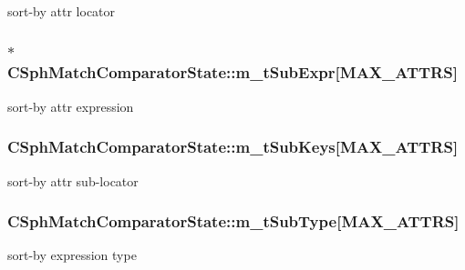 sort-\/by attr locator 

\hypertarget{structCSphMatchComparatorState_a0a3dca4e697aafc3619015e613e2259a}{
\subsubsection[{m\-\_\-t\-Sub\-Expr}]{$\ast$ C\-Sph\-Match\-Comparator\-State\-::m\-\_\-t\-Sub\-Expr\mbox{[}{\bf M\-A\-X\-\_\-\-A\-T\-T\-R\-S}\mbox{]}}}\label{structCSphMatchComparatorState_a0a3dca4e697aafc3619015e613e2259a}


sort-\/by attr expression 

\hypertarget{structCSphMatchComparatorState_a76a5f5712b5cb523d0072a50c5ee0866}{
\subsubsection[{m\-\_\-t\-Sub\-Keys}]{ C\-Sph\-Match\-Comparator\-State\-::m\-\_\-t\-Sub\-Keys\mbox{[}{\bf M\-A\-X\-\_\-\-A\-T\-T\-R\-S}\mbox{]}}}\label{structCSphMatchComparatorState_a76a5f5712b5cb523d0072a50c5ee0866}


sort-\/by attr sub-\/locator 

\hypertarget{structCSphMatchComparatorState_ace03d56e87da138c809986ea6bfa77f6}{
\subsubsection[{m\-\_\-t\-Sub\-Type}]{ C\-Sph\-Match\-Comparator\-State\-::m\-\_\-t\-Sub\-Type\mbox{[}{\bf M\-A\-X\-\_\-\-A\-T\-T\-R\-S}\mbox{]}}}\label{structCSphMatchComparatorState_ace03d56e87da138c809986ea6bfa77f6}


sort-\/by expression type 

